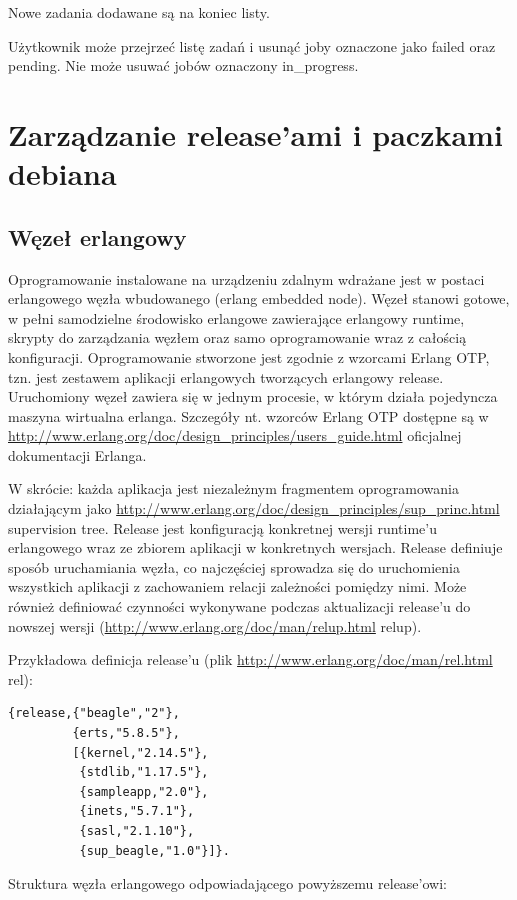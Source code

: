 \documentclass[polish,12pt]{aghthesis}
\begin{document}
Nowe zadania dodawane są na koniec listy.

Użytkownik może przejrzeć listę zadań i usunąć joby oznaczone jako failed oraz pending. Nie może usuwać jobów oznaczony in\_progress.

\section{Zarządzanie release'ami i paczkami debiana}
\subsection{Węzeł erlangowy}
Oprogramowanie instalowane na urządzeniu zdalnym wdrażane jest w postaci erlangowego węzła wbudowanego (erlang embedded node). Węzeł stanowi gotowe, w pełni samodzielne środowisko erlangowe zawierające erlangowy runtime, skrypty do zarządzania węzłem oraz samo oprogramowanie wraz z całością konfiguracji. Oprogramowanie stworzone jest zgodnie z wzorcami Erlang OTP, tzn. jest zestawem aplikacji erlangowych tworzących erlangowy release. Uruchomiony węzeł zawiera się w jednym procesie, w którym działa pojedyncza maszyna wirtualna erlanga. Szczegóły nt. wzorców Erlang OTP dostępne są w  \url{http://www.erlang.org/doc/design_principles/users_guide.html} oficjalnej dokumentacji Erlanga.

W skrócie: każda aplikacja jest niezależnym fragmentem oprogramowania działającym jako \url{http://www.erlang.org/doc/design_principles/sup_princ.html} supervision tree. Release jest konfiguracją konkretnej wersji runtime'u erlangowego wraz ze zbiorem aplikacji w konkretnych wersjach. Release definiuje sposób uruchamiania węzła, co najczęściej sprowadza się do uruchomienia wszystkich aplikacji z zachowaniem relacji zależności pomiędzy nimi. Może również definiować czynności wykonywane podczas aktualizacji release'u do nowszej wersji (\url{http://www.erlang.org/doc/man/relup.html} relup).

Przykładowa definicja release'u (plik \url{http://www.erlang.org/doc/man/rel.html} rel):

\begin{verbatim}
{release,{"beagle","2"},
         {erts,"5.8.5"},
         [{kernel,"2.14.5"},
          {stdlib,"1.17.5"},
          {sampleapp,"2.0"},
          {inets,"5.7.1"},
          {sasl,"2.1.10"},
          {sup_beagle,"1.0"}]}.
\end{verbatim}

Struktura węzła erlangowego odpowiadającego powyższemu release'owi:
\end{document}
